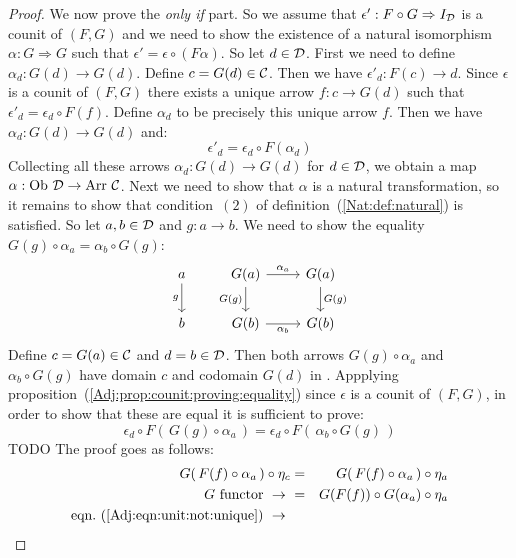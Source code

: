 \begin{proof}
    We now prove the {\em only if} part. So we assume that 
    $\epsilon':F\circ G\Rightarrow I_{\cal D}$ is a counit of $(F,G)$ and we need
    to show the existence of a natural isomorphism $\alpha:G\Rightarrow G$
    such that $\epsilon'=\epsilon\circ(F\alpha)$. So let $d\in\mbox{$\cal D$}$. First we need
    to define $\alpha_{d}:G(d)\to G(d)$. Define $c=G(d)\in\mbox{$\cal C$}$. Then we 
    have $\epsilon'_{d}:F(c)\to d$. Since $\epsilon$ is a counit of $(F,G)$ 
    there exists a unique arrow $f:c\to G(d)$ such that $\epsilon'_{d}
    =\epsilon_{d}\circ F(f)$.
    Define $\alpha_{d}$ to be precisely this unique arrow $f$. Then we 
    have $\alpha_{d}:G(d)\to G(d)$ and:
        \begin{equation}\label{Adj:eqn:counit:not:unique}
            \epsilon'_{d}=\epsilon_{d}\circ F(\alpha_{d})
        \end{equation}
    Collecting all these arrows $\alpha_{d}:G(d)\to G(d)$ for $d\in\mbox{$\cal D$}$,
    we obtain a map $\alpha:\mbox{\rm Ob}\ \mbox{$\cal D$}\to\mbox{\rm Arr}\ \mbox{$\cal C$}$. Next we need to show 
    that $\alpha$ is a natural transformation, so it remains to show that
    condition~$(2)$ of definition~(\ref{Nat:def:natural}) is satisfied. So
    let $a,b\in\mbox{$\cal D$}$ and $g:a\to b$. We need to show the equality
    $G(g)\circ\alpha_{a}=\alpha_{b}\circ G(g)$:
    \[
        \begin{tikzcd}
            a\arrow[d,swap, "g"]
            &G(a)\arrow[r, "\alpha_{a}"]\arrow[d, swap,"G(g)"]
            &G(a)\arrow[d, "G(g)"]
            \\
            b
            &G(b)\arrow[r, swap, "\alpha_{b}"]
            &G(b)
        \end{tikzcd}
    \]
    Define $c=G(a)\in\mbox{$\cal C$}$ and $d=b\in\mbox{$\cal D$}$. Then both arrows 
    $G(g)\circ\alpha_{a}$ and $\alpha_{b}\circ G(g)$ have domain $c$ and
    codomain $G(d)$ in \Cat. Appplying 
    proposition~(\ref{Adj:prop:counit:proving:equality}) 
    since $\epsilon$ is a counit of $(F,G)$, in order to show that these are equal
    it is sufficient to prove:
        \[
            \epsilon_{d}\circ F(\,G(g)\circ\alpha_{a}\,)=
            \epsilon_{d}\circ F(\,\alpha_{b}\circ G(g)\,)
        \]
    TODO
    The proof goes as follows:
        \begin{eqnarray*}G(\,F(f)\circ\alpha_{a}\,)\circ\eta_{c}
            &=&G(\,F(f)\circ\alpha_{a}\,)\circ\eta_{a}\\
            \mbox{$G$ functor}\ \to\ 
            &=&G(F(f))\circ G(\alpha_{a})\circ\eta_{a}\\
            \mbox{eqn.~(\ref{Adj:eqn:unit:not:unique})}\ \to\ 

\end{eqnarray*}
\end{proof}
